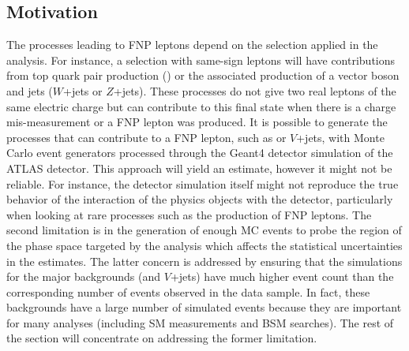 \subsection{Motivation}
\label{sec:fake.mct}
The processes leading to FNP leptons depend on the selection applied in the analysis. For instance, a selection with same-sign leptons 
will have contributions from top quark pair production (\ttbar) or the associated production of a vector boson and jets 
($W$+jets or $Z$+jets). These processes do not give two real leptons of the 
same electric charge but can contribute to this final state when 
there is a charge mis-measurement or a FNP lepton was produced.
It is possible to generate the processes that can contribute to a FNP lepton, such as \ttbar or 
$V$+jets, with Monte Carlo event generators processed through the Geant4 
detector simulation of the ATLAS detector.  
This approach will yield an estimate, however it might not be reliable. For instance, the detector simulation itself might not 
reproduce the true behavior of the interaction of the physics objects with the detector, particularly when looking at rare processes 
such as the production of FNP leptons. The second limitation is in the generation of enough MC events to probe the region of the 
phase space targeted by the analysis which affects the statistical uncertainties in the estimates.
The latter concern is addressed by ensuring that the simulations for the major backgrounds (\ttbar and $V$+jets) have much 
higher event count than the corresponding number of events observed in the data sample.
In fact, these backgrounds have a large number of simulated events because they are important for many analyses 
(including SM measurements and BSM searches).
The rest of the section will concentrate on addressing the former limitation. 



